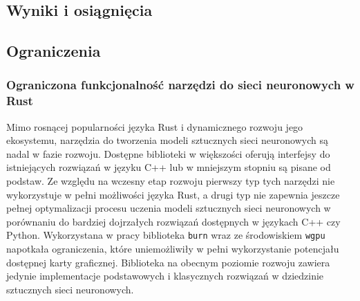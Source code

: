     \subsection{Wyniki i osiągnięcia}

    \subsection{Ograniczenia}

        \subsubsection{Ograniczona funkcjonalność narzędzi do sieci neuronowych w Rust}

            Mimo rosnącej popularności języka Rust\cite{Rust:popularity} i dynamicznego rozwoju jego ekosystemu, narzędzia do tworzenia modeli sztucznych sieci neuronowych są nadal w fazie rozwoju. Dostępne biblioteki w większości oferują interfejsy do istniejących rozwiązań w języku C++ lub w mniejszym stopniu są pisane od podstaw. Ze względu na wczesny etap rozwoju pierwszy typ tych narzędzi nie wykorzystuje w pełni możliwości języka Rust, a drugi typ nie zapewnia jeszcze pełnej optymalizacji procesu uczenia modeli sztucznych sieci neuronowych w porównaniu do bardziej dojrzałych rozwiązań dostępnych w językach C++ czy Python. Wykorzystana w pracy biblioteka \texttt{burn} wraz ze środowiskiem \texttt{wgpu} napotkała ograniczenia, które uniemożliwiły w pełni wykorzystanie potencjału dostępnej karty graficznej. Biblioteka na obecnym poziomie rozwoju zawiera jedynie implementacje podstawowych i klasycznych rozwiązań w dziedzinie sztucznych sieci neuronowych.


